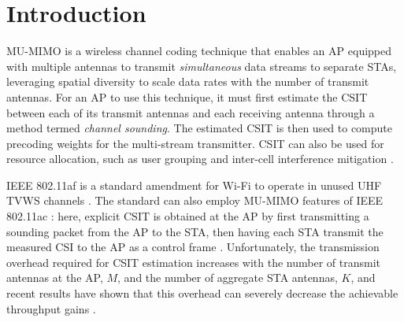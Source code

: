\section{Introduction}
\label{sec_opportunistic_intro}
	
	
		\ac{MU-MIMO} is a wireless channel coding technique that enables an \ac{AP} equipped with multiple antennas to transmit \textit{simultaneous} data streams to separate \acp{STA}, leveraging spatial diversity to scale data rates with the number of transmit antennas.
	For an \ac{AP} to use this technique, it must first estimate the \ac{CSIT} between each of its transmit antennas and each receiving antenna through a method termed \textit{channel sounding}.
	The estimated \ac{CSIT} is then	used to compute precoding weights for the multi-stream transmitter.
\ac{CSIT} can also be used for resource allocation, such as user grouping \cite{mao2012sus} and inter-cell interference mitigation \cite{rahman2010intercell}.

	IEEE 802.11af is a standard amendment for Wi-Fi to operate in unused UHF \ac{TVWS} channels \cite{flores2013af}.
	The standard can also employ MU-MIMO features of IEEE 802.11ac \cite{std11ac}: here, explicit \ac{CSIT} is obtained at the \ac{AP} by first transmitting a sounding packet from the \ac{AP} to the \ac{STA}, then having each \ac{STA} transmit the measured \ac{CSI} to the \ac{AP} as a control frame \cite{std11af}.
	Unfortunately, the transmission overhead required for \ac{CSIT} estimation increases with the number of transmit antennas at the \ac{AP}, $M$, and the number of aggregate \ac{STA} antennas, $K$, and recent results have shown that this overhead can severely decrease the achievable throughput gains \cite{xie2013adaptive, bejarano2014mute}.
	
